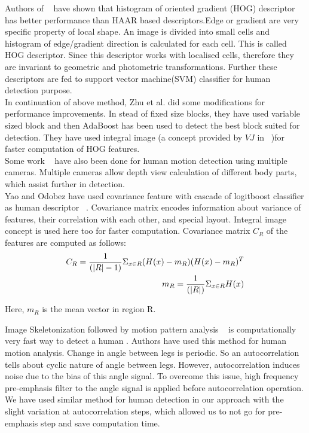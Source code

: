 \indent Authors of ~\cite{20, 21} have shown that histogram of oriented
gradient (HOG) descriptor has better performance than HAAR based
descriptors.Edge or gradient are very specific property of local shape.
An image is divided into small cells and histogram of edge/gradient
direction is calculated for each cell. This is called HOG descriptor.
Since this descriptor works with localised cells, therefore they are
invariant to geometric and photometric transformations. Further these
descriptors are fed to support vector machine(SVM) classifier for human
detection purpose.\\

\indent In continuation of above method, Zhu et al. did some
modifications for performance improvements. In stead of fixed size
blocks, they have used variable sized block and then AdaBoost has been
used to detect the best block suited for detection. They have used
integral image (a concept provided by $VJ$ in ~\cite{17})for faster
computation of HOG features.\\

\indent Some work ~\cite{30} have also been done for human motion
detection using multiple cameras. Multiple cameras allow depth view
calculation of different body parts, which assist further in
detection.\\

\indent Yao and Odobez have used covariance feature with cascade of
logitboost classifier as human descriptor ~\cite{19}. Covariance matrix
encodes information about variance of features, their correlation with
each other, and special layout. Integral image concept is used here too
for faster computation. Covariance matrix $C_R$ of the features are
computed as follows:\\
\begin{eqnarray}
C_R = {1 \over {(|R| - 1)}} \Sigma _{x \in R} (H(x) - m_R) (H(x) - m_R)^T \nonumber \\
m_R = {1 \over {(|R|)}} \Sigma _{x \in R} H(x)
\end{eqnarray}

Here, $m_R$ is the mean vector in region R.

\indent Image Skeletonization followed by motion pattern analysis
~\cite{32, 22, 31} is computationally very fast way to detect a human .
Authors have used this method for human motion analysis. Change in angle
between legs is periodic. So an autocorrelation tells about cyclic
nature of angle between legs.  However, autocorrelation induces noise
due to the bias of this angle signal.  To overcome this issue, high
frequency pre-emphasis filter to the angle signal is applied before
autocorrelation operation. We have used similar method for human
detection in our approach with the slight variation at autocorrelation
steps, which allowed us to not go for pre-emphasis step and save
computation time.\\

